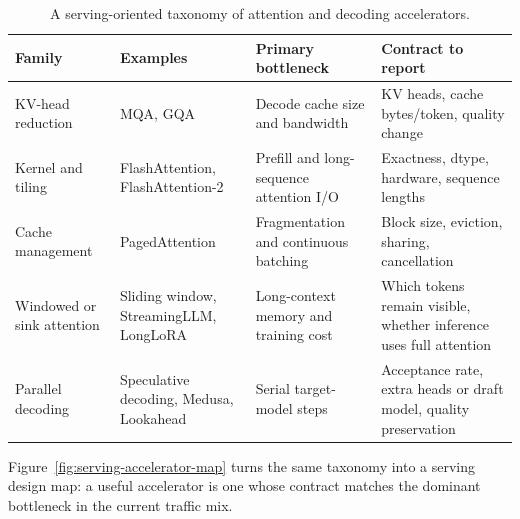 \begin{table}[t]
\caption{A serving-oriented taxonomy of attention and decoding accelerators.}
\label{tab:serving-acceleration-taxonomy}
\small
\begin{tabular}{@{}p{2.2cm}p{2.6cm}p{2.9cm}p{2.8cm}@{}}
\toprule
Family & Examples & Primary bottleneck & Contract to report \\
\midrule
KV-head reduction & MQA, GQA & Decode cache size and bandwidth & KV heads, cache bytes/token, quality change \\
Kernel and tiling & FlashAttention, FlashAttention-2 & Prefill and long-sequence attention I/O & Exactness, dtype, hardware, sequence lengths \\
Cache management & PagedAttention & Fragmentation and continuous batching & Block size, eviction, sharing, cancellation \\
Windowed or sink attention & Sliding window, StreamingLLM, LongLoRA & Long-context memory and training cost & Which tokens remain visible, whether inference uses full attention \\
Parallel decoding & Speculative decoding, Medusa, Lookahead & Serial target-model steps & Acceptance rate, extra heads or draft model, quality preservation \\
\bottomrule
\end{tabular}
\end{table}

Figure~\ref{fig:serving-accelerator-map} turns the same taxonomy into a serving design map: a useful accelerator is one whose contract matches the dominant bottleneck in the current traffic mix.

